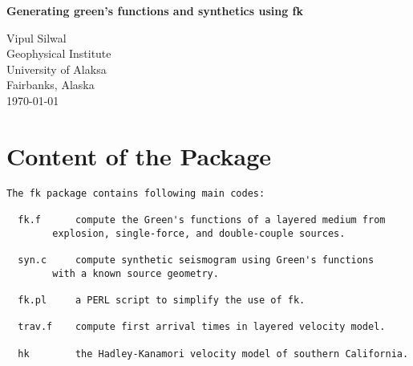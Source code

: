 \documentclass[11pt,titlepage,fleqn]{article}
\begin{document}
\begin{center}
\huge{\bf Generating green's functions and synthetics using fk}
\end{center}

\begin{center}
\large{
Vipul Silwal \\
Geophysical Institute \\
University of Alaksa\\
Fairbanks, Alaska\\
\today}
\end{center}

\tableofcontents

\pagebreak

\section{Content of the Package}
\begin{verbatim}
The fk package contains following main codes:

  fk.f		compute the Green's functions of a layered medium from
		explosion, single-force, and double-couple sources.

  syn.c		compute synthetic seismogram using Green's functions
 		with a known source geometry.

  fk.pl		a PERL script to simplify the use of fk.

  trav.f	compute first arrival times in layered velocity model.

  hk		the Hadley-Kanamori velocity model of southern California.
\end{verbatim}

\end{document}
